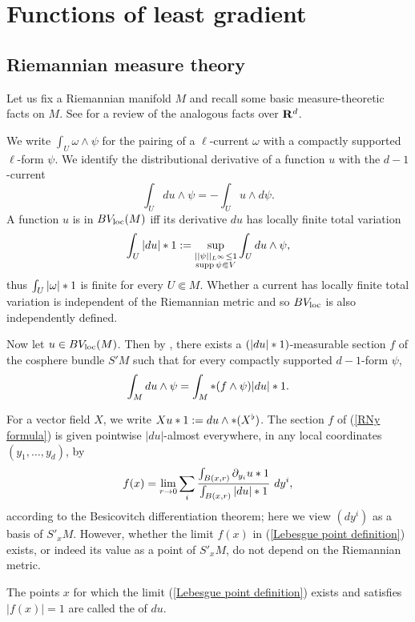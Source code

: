 \section{Functions of least gradient}\label{LeastGradientFunctions}
\subsection{Riemannian measure theory}
Let us fix a Riemannian manifold $M$ and recall some basic measure-theoretic facts on $M$.
See \cite[Chapter 1]{Giusti77} for a review of the analogous facts over $\mathbf{R}^d$.

We write $\int_U \omega \wedge \psi$ for the pairing of a $\ell$-current $\omega$ with a compactly supported $\ell$-form $\psi$.
We identify the distributional derivative of a function $u$ with the $d-1$-current
$$\int_U du \wedge \psi = -\int_U u \wedge d\psi.$$
A function $u$ is in $BV_{\mathrm{loc}}(M)$ iff its derivative $du$ has locally finite total variation
$$\int_U |du|*1 := \sup_{\substack{||\psi||_{L^\infty} \leq 1\\\operatorname{supp} \psi \Subset V}} \int_U du \wedge \psi,$$
thus $\int_U |\omega|*1$ is finite for every $U \Subset M$.
Whether a current has locally finite total variation is independent of the Riemannian metric and so $BV_{\mathrm{loc}}$ is also independently defined.

Now let $u \in BV_{\mathrm{loc}}(M)$.
Then by \cite[Theorem 4.14]{simon1983GMT}, there exists a $(|du|*1)$-measurable section $f$ of the cosphere bundle $S'M$ such that for every compactly supported $d-1$-form $\psi$,
\begin{equation}\label{RNy formula}
\int_M du \wedge \psi = \int_M *(f \wedge \psi) |du|*1.
\end{equation}

For a vector field $X$, we write $Xu*1 := du \wedge *(X^\flat)$.
The section $f$ of (\ref{RNy formula}) is given pointwise $|du|$-almost everywhere, in any local coordinates $(y_1, \dots, y_d)$, by
\begin{equation}\label{Lebesgue point definition}
    f(x) = \lim_{r \to 0} \sum_i \frac{\int_{B(x, r)} \partial_{y_i} u*1}{\int_{B(x, r)} |du|*1} ~dy^i,
\end{equation}
according to the Besicovitch differentiation theorem; here we view $(dy^i)$ as a basis of $S'_xM$.
However, whether the limit $f(x)$ in (\ref{Lebesgue point definition}) exists, or indeed its value as a point of $S'_xM$, do not depend on the Riemannian metric.

\begin{definition}
The points $x$ for which the limit (\ref{Lebesgue point definition}) exists and satisfies $|f(x)| = 1$ are called the  of $du$.
\end{definition}

